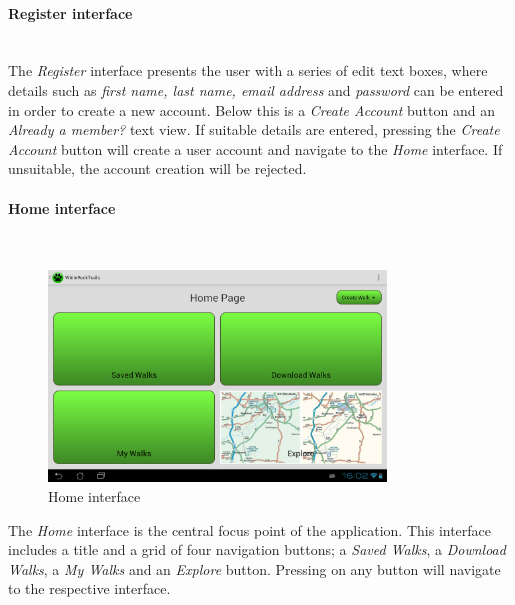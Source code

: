 \documentclass[11pt,a4paper]{report}
\begin{document}
\paragraph{Register interface}\mbox{}\\

The \emph{Register} interface presents the user with a series of edit text boxes, where details such as \emph{first name, last name, email address} and \emph{password} can be entered in order to create a new account. Below this is a \emph{Create Account} button and an \emph{Already a member?} text view. If suitable details are entered, pressing the \emph{Create Account} button will create a user account and navigate to the \emph{Home} interface. If unsuitable, the account creation will be rejected.

\paragraph*{Home interface}\mbox{}\\

\begin{figure}[H]
    \centering
    \includegraphics[width=0.8\textwidth]{chris/home}
    \caption{Home interface}
    \label{fig:home}
\end{figure}

The \emph{Home} interface is the central focus point of the application. This interface includes a title and a grid of four navigation buttons; a \emph{Saved Walks}, a \emph{Download Walks}, a \emph{My Walks} and an \emph{Explore} button. Pressing on any button will navigate to the respective interface.
\end{document}

